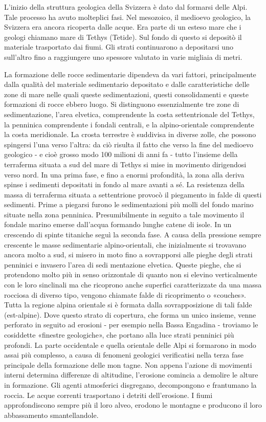 \documentclass[a4paper]{article}
\begin{document}
L'inizio della struttura geologica della Svizzera è dato dal formarsi delle Alpi. Tale processo
ha avuto molteplici fasi. Nel mesozoico, il medioevo geologico, la Svizzera era ancora ricoperta
dalle acque. Era parte di un esteso mare che i geologi chiamano mare di Tethys (Tetide). Sul
fondo di questo si depositò il materiale trasportato dai fiumi. Gli strati continuarono a
depositarsi uno sull'altro fino a raggiungere uno spessore valutato in varie migliaia di metri.

La formazione delle rocce sedimentarie dipendeva da vari fattori, principalmente dalla qualità
del materiale sedimentario depositato e dalle caratteristiche delle zone di mare nelle quali
queste sedimentazioni, questi consolidamenti e queste formazioni di rocce ebbero luogo. Si
distinguono essenzialmente tre zone di sedimentazione, l'area elvetica, comprendente la costa
settentrionale del Tethys, la penninica comprendente i fondali centrali, e la alpino-orientale
comprendente la costa meridionale. La crosta terrestre è suddivisa in diverse zolle, che
possono spingersi l'una verso l'altra: da ciò risulta il fatto che verso la fine del medioevo
geologico - e cioè grosso modo 100 milioni di anni fa - tutto l'insieme della terraferma situata
a sud del mare di Tethys si mise in movimento dirigendosi verso nord.
In una prima fase, e fino a enormi profondità, la zona alla deriva spinse i sedimenti depositati
in fondo al mare avanti a sé. La resistenza della massa di terraferma situata a settentrione
provocò il piegamento in falde di questi sedimenti. Prime a piegarsi furono le sedimentazioni
più molli del fondo marino situate nella zona penninica. Presumibilmente in seguito a tale
movimento il fondale marino emerse dall'acqua formando lunghe catene di isole. In un
crescendo di spinte titaniche seguì la seconda fase. A causa della pressione sempre crescente
le masse sedimentarie alpino-orientali, che inizialmente si trovavano ancora molto a sud, si
misero in moto fino a sovrapporsi alle pieghe degli strati penninici e invasero l'area di sedi
mentazione elvetica. Queste pieghe, che si protendono molto più in senso orizzontale di
quanto non si elevino verticalmente con le loro sinclinali ma che ricoprono anche superfici
caratterizzate da una massa rocciosa di diverso tipo, vengono chiamate falde di ricoprimento
o «couches». Tutta la regione alpina orientale si è formata dalla sovrapposizione di tali falde
(est-alpine). Dove questo strato di copertura, che forma un unico insieme, venne perforato in
seguito ad erosioni - per esempio nella Bassa Engadina - troviamo le cosiddette «finestre
geologiche», che portano alla luce strati penninici più profondi.
La parte occidentale e quella orientale delle Alpi si formarono in modo assai più complesso, a
causa di fenomeni geologici verificatisi nella terza fase principale della formazione delle mon
tagne. Non appena l'azione di movimenti interni determina differenze di altitudine, l'erosione
comincia a demolire le alture in formazione. Gli agenti atmosferici disgregano, decompongono
e frantumano la roccia. Le acque correnti trasportano i detriti dell'erosione. I fiumi
approfondiscono sempre più il loro alveo, erodono le montagne e producono il loro
abbassamento smantellandole.
\end{document}
